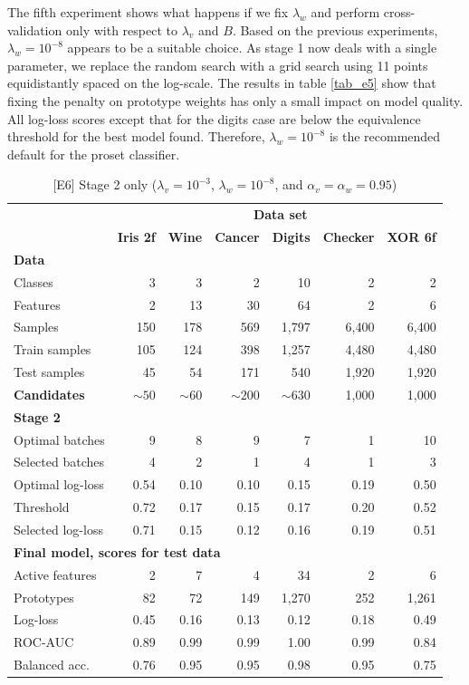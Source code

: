 %
The fifth experiment shows what happens if we fix $\lambda_w$ and perform cross-validation only with respect to $\lambda_v$ and $B$.
Based on the previous experiments, $\lambda_w=10^{-8}$ appears to be a suitable choice.
As stage 1 now deals with a single parameter, we replace the random search with a grid search using 11 points equidistantly spaced on the log-scale.
The results in table \ref{tab_e5} show that fixing the penalty on prototype weights has only a small impact on model quality.
All log-loss scores except that for the digits case are below the equivalence threshold for the best model found.
Therefore, $\lambda_w=10^{-8}$ is the recommended default for the proset classifier.\par
%
\clearpage
%
\begin{table}
\caption{[E6] Stage 2 only ($\lambda_v=10^{-3}$, $\lambda_w=10^{-8}$, and $\alpha_v=\alpha_w=0.95$)}
\label{tab_e6}
%
\begin{center}
\small
\begin{tabular}{|lrrrrrr|}
\hline
&\multicolumn{6}{c|}{\textbf{\hrulefill\ Data set \hrulefill}}\\
&\textbf{Iris 2f}&\textbf{Wine}&\textbf{Cancer}&\textbf{Digits}&\textbf{Checker}&\textbf{XOR 6f}\\
\multicolumn{7}{|l|}{\textbf{Data}}\\
Classes&3&3&2&10&2&2\\
Features&2&13&30&64&2&6\\
Samples&150&178&569&1,797&6,400&6,400\\
Train samples&105&124&398&1,257&4,480&4,480\\
Test samples&45&54&171&540&1,920&1,920\\
\textbf{Candidates}&$\sim50$&$\sim60$&$\sim200$&$\sim630$&1,000&1,000\\
\multicolumn{7}{|l|}{\textbf{Stage 2}}\\
Optimal batches&9&8&9&7&1&10\\
Selected batches&4&2&1&4&1&3\\
Optimal log-loss&0.54&0.10&0.10&0.15&0.19&0.50\\
Threshold&0.72&0.17&0.15&0.17&0.20&0.52\\
Selected log-loss&0.71&0.15&0.12&0.16&0.19&0.51\\
\multicolumn{7}{|l|}{\textbf{Final model, scores for test data}}\\
Active features&2&7&4&34&2&6\\
Prototypes&82&72&149&1,270&252&1,261\\
Log-loss&0.45&0.16&0.13&0.12&0.18&0.49\\
ROC-AUC&0.89&0.99&0.99&1.00&0.99&0.84\\
Balanced acc.&0.76&0.95&0.95&0.98&0.95&0.75\\
\hline
\end{tabular}
\end{center}
\end{table}

